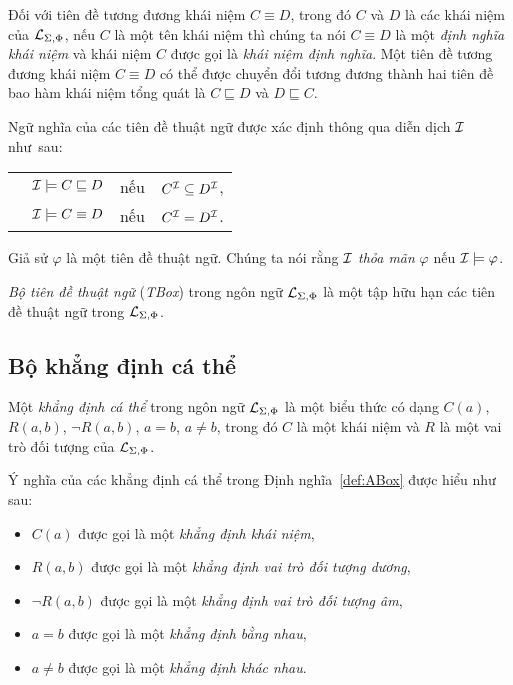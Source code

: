 Đối với tiên đề tương đương khái niệm $C \equiv D$, trong đó $C$ và $D$ là các khái niệm của $\mathcal{L}_{\Sigma,\Phi}$, nếu $C$ là một tên khái niệm thì chúng ta nói $C \equiv D$ là một {\em định nghĩa khái niệm} và khái niệm $C$ được gọi là {\em khái niệm định nghĩa}. 
Một tiên đề tương đương khái niệm $C \equiv D$ có thể được chuyển đổi tương đương thành hai tiên đề bao hàm khái niệm tổng quát là $C \sqsubseteq D$ và $D \sqsubseteq C$.

Ngữ nghĩa của các tiên đề thuật ngữ được xác định thông qua diễn dịch $\mathcal{I}$ như~sau:\\[1.5ex]
\begin{tabular}{c l c l}
	& $\mathcal{I} \models C \sqsubseteq D$ & nếu & $C^{\mathcal{I}} \subseteq D^{\mathcal{I}}$,\\[0.5ex]
	& $\mathcal{I} \models C \equiv D$ & nếu & $C^{\mathcal{I}} = D^{\mathcal{I}}$.
\end{tabular}

Giả sử $\varphi$ là một tiên đề thuật ngữ. Chúng ta nói rằng $\mathcal{I}$ {\em thỏa mãn} $\varphi$ nếu $\mathcal{I} \models \varphi$.

\begin{Definition}
\label{def:TBox}
	{\em Bộ tiên đề thuật ngữ} ({\em TBox}) trong ngôn ngữ $\mathcal{L}_{\Sigma,\Phi}$ là một tập hữu hạn các tiên đề thuật ngữ trong $\mathcal{L}_{\Sigma,\Phi}$.\myend
\end{Definition}

\subsection{Bộ khẳng định cá thể}
\label{sec:Chap1.ABox}

\begin{Definition}
\label{def:AssertionIndividual}
Một {\em khẳng định cá thể} trong ngôn ngữ $\mathcal{L}_{\Sigma,\Phi}$ là một biểu thức có dạng $C(a)$, $R(a,b)$, $\neg R(a,b)$, $a=b$, $a \not=b$, trong đó $C$ là một khái niệm và $R$ là một vai trò đối tượng của $\mathcal{L}_{\Sigma,\Phi}$.\myend
\end{Definition}

Ý nghĩa của các khẳng định cá thể trong Định nghĩa~\ref{def:ABox} được hiểu như sau:
\begin{itemize}
  \item $C(a)$ được gọi là một {\em khẳng định khái niệm},
  \item $R(a,b)$ được gọi là một {\em khẳng định vai trò đối tượng dương},
  \item $\neg R(a,b)$ được gọi là một {\em khẳng định vai trò đối tượng âm},
  \item $a=b$ được gọi là một {\em khẳng định bằng nhau},
  \item $a \not=b$ được gọi là một {\em khẳng định khác nhau}.        
\end{itemize}

